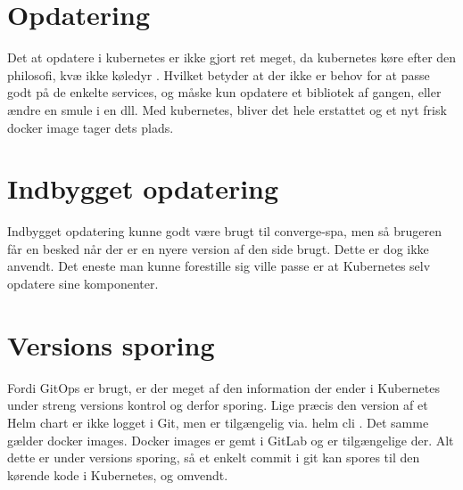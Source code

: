 \section{Opdatering}

Det at opdatere i kubernetes er ikke gjort ret meget, da kubernetes køre efter den philosofi, kvæ ikke køledyr \cite{documentation_terms}. Hvilket betyder at der ikke er behov for at passe godt på de enkelte services, og måske kun opdatere et bibliotek af gangen, eller ændre en smule i en dll. Med kubernetes, bliver det hele erstattet og et nyt frisk docker image tager dets plads.

\section{Indbygget opdatering}

Indbygget opdatering kunne godt være brugt til converge-spa, men så brugeren får en besked når der er en nyere version af den side brugt. Dette er dog ikke anvendt. Det eneste man kunne forestille sig ville passe er at Kubernetes selv opdatere sine komponenter.

\section{Versions sporing}

Fordi GitOps er brugt, er der meget af den information der ender i Kubernetes under streng versions kontrol og derfor sporing. Lige præcis den version af et Helm chart er ikke logget i Git, men er tilgængelig via. helm cli \cite{documentation_terms}. Det samme gælder docker images. Docker images er gemt i GitLab og er tilgængelige der. Alt dette er under versions sporing, så et enkelt commit i git kan spores til den kørende kode i Kubernetes, og omvendt.
